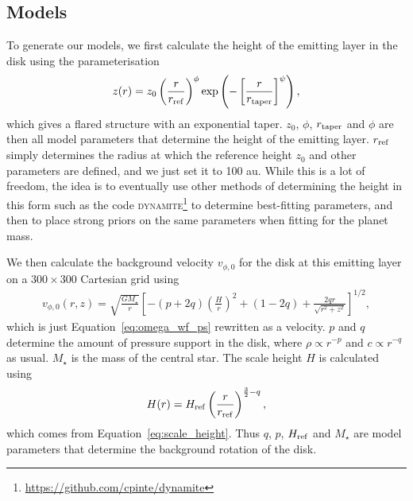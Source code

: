 \subsection{Models}

To generate our models, we first calculate the height of the emitting layer in the disk using the parameterisation \citep{pinte2018}
\begin{align}
    z(r) = z_0 \left( \frac{r}{r_{\rm ref}} \right)^\phi \exp \left( -\left[ \frac{r}{r_\mathrm{taper}} \right]^{\psi} \right), \label{eq:height}
\end{align}
which gives a flared structure with an exponential taper. $z_0$, $\phi$, $r_{\rm taper}$ and $\phi$ are then all model parameters that determine the height of the emitting layer. 
$r_{\rm ref}$ simply determines the radius at which the reference height $z_0$ and other parameters are defined, and we just set it to 100 au.
While this is a lot of freedom, the idea is to eventually use other methods of determining the height in this form such as the code \textsc{dynamite}\footnote{\url{https://github.com/cpinte/dynamite}} \citep{pinte2018} to determine best-fitting parameters, and then to place strong priors on the same parameters when fitting for the planet mass.

We then calculate the background velocity $v_{\phi,\mathrm{0}}$ for the disk at this emitting layer on a $300 \times 300$ Cartesian grid using
\begin{align}
    v_{\phi,\mathrm{0}}(r,z) = \sqrt{\frac{G M_\star}{r}} \left[ - \left(p + 2q\right) \left( \frac{H}{r} \right)^2 + \left( 1-2q \right) + \frac{2qr}{\sqrt{r^2 + z^2}}\right]^{1/2}, \label{eq:omega_wf_ps_full}
\end{align}
which is just Equation~\eqref{eq:omega_wf_ps} rewritten as a velocity.
$p$ and $q$ determine the amount of pressure support in the disk, where $\rho \propto r^{-p}$ and $c \propto r^{-q}$ as usual.
$M_\star$ is the mass of the central star.
The scale height $H$ is calculated using
\begin{align}
    H(r) = H_{\rm ref} \left( \frac{r}{r_{\rm ref}} \right)^{\frac{3}{2} - q},
\end{align}
which comes from Equation~\eqref{eq:scale_height}.
Thus $q$, $p$, $H_{\rm ref}$ and $M_\star$ are model parameters that determine the background rotation of the disk.

